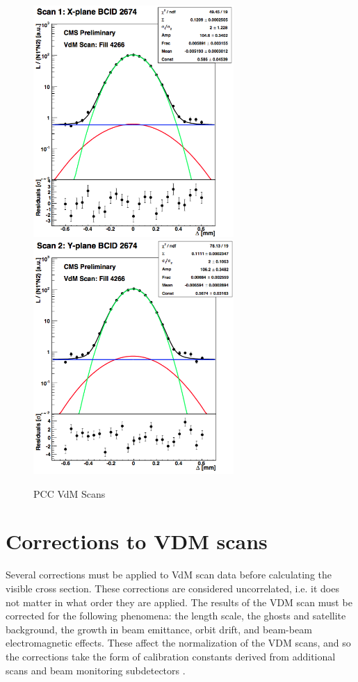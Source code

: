 \begin{figure}[]
\begin{centering}
\includegraphics[width=3in]{Chapter4/importfigs/CMS-PAS-LUM-15-001_Figure_005-a.png}
\includegraphics[width=3in]{Chapter4/importfigs/CMS-PAS-LUM-15-001_Figure_005-b.png}
\par\end{centering}
\caption{PCC VdM Scans \cite{CMS:2013gfa} \label{fig:pccVdMScans}}
\end{figure}

\section{Corrections to VDM scans}

Several corrections must be applied to VdM scan data before calculating the visible cross section. These corrections are considered uncorrelated, i.e. it does not matter in what order they are applied. The results of the VDM scan must be corrected for the following phenomena: the length scale, the ghosts and satellite background, the growth in beam emittance, orbit drift, and beam-beam electromagnetic effects. These affect the normalization of the VDM scans, and so the corrections take the form of calibration constants derived from additional scans and beam monitoring subdetectors \cite{CMS:2013gfa}. 

